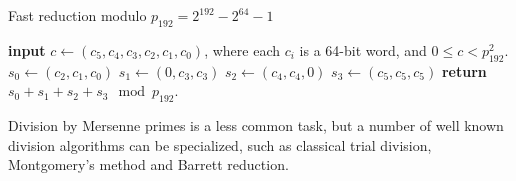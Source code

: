 \begin{algorithm}[H]
   \caption{Fast reduction modulo $p_{192} = 2^{192} - 2^{64} - 1$}
   \label{alg:solina}
   \begin{algorithmic}
      \State \textbf{input} $c \gets (c_5, c_4, c_3, c_2, c_1, c_0)$, where each $c_i$ is a 64-bit word, and $0 \le c < p^2_{192}$.
      \State $s_0 \gets (c_2, c_1, c_0)$
      \State $s_1 \gets (0, c_3, c_3)$
      \State $s_2 \gets (c_4, c_4, 0)$
      \State $s_3 \gets (c_5, c_5, c_5)$
      \State \textbf{return} $s_0 + s_1 + s_2 + s_3 \mod p_{192}$.
   \end{algorithmic}
\end{algorithm}

Division by Mersenne primes is a less common task, but a number of well known division algorithms can be specialized, such as 
 classical trial division, Montgomery's method and Barrett reduction.




